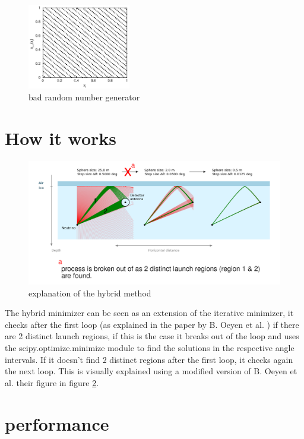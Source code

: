 \documentclass{article}
\begin{document}
\begin{figure}[ht]
	\centering
	\includegraphics[width=0.4\textwidth]{figures/BadRandom.png}
	\caption{bad random number generator}
	\label{fig:badrandom}
\end{figure}
\newpage
\section{How it works}
\begin{figure}[ht]
	\centering
	\includegraphics[width=\textwidth]{figures/explanation.png}
	\caption{explanation of the hybrid method}
	\label{fig:explanation}
\end{figure}
The hybrid minimizer can be seen as an extension of the iterative minimizer, it
checks after the first loop (as explained in the paper by B. Oeyen et al.
\cite{2022icrc.confE1027O}) if there are 2 distinct launch regions, if this is
the case it breaks out of the loop and uses the scipy.optimize.minimize module
to find the solutions in the respective angle intervals. If it doesn't find 2 distinct regions after the first loop, it checks again the next loop. This is visually explained using 
a modified version of B. Oeyen et al. their figure in figure \ref{fig:explanation}. 
\section{performance}
\end{document}
